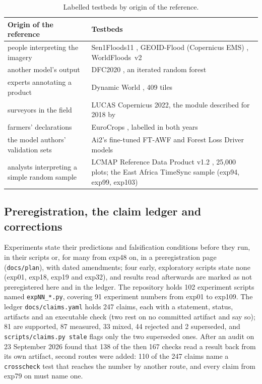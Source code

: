 \documentclass[11pt,a4paper]{article}
\newcommand{\code}[1]{\texttt{#1}}
\begin{document}
\begin{table}[h]
\centering\small
\begin{tabularx}{\linewidth}{lX}
\toprule
Origin of the reference & Testbeds \\
\midrule
people interpreting the imagery & Sen1Floods11 \citep{bonafilia2020}, GEOID-Flood (Copernicus EMS) \citep{chiriaco2026}, WorldFloods~v2 \\
another model's output & DFC2020 \citep{yokoya2020}, an iterated random forest \\
experts annotating a product & Dynamic World \citep{brown2022}, 409 tiles \\
surveyors in the field & LUCAS Copernicus 2022, the module described for 2018 by \citet{dandrimont2021} \\
farmers' declarations & EuroCrops \citep{schneider2023}, labelled in both years \\
the model authors' validation sets & Ai2's fine-tuned FT-AWF and Forest Loss Driver models \\
analysts interpreting a simple random sample & LCMAP Reference Data Product v1.2 \citep{pengra2020}, 25,000 plots; the East Africa TimeSync sample (exp94, exp99, exp103) \\
\bottomrule
\end{tabularx}
\caption{Labelled testbeds by origin of the reference.}
\label{tab:refs}
\end{table}

\subsection{Preregistration, the claim ledger and corrections}
\label{sec:protocol-ledger}

Experiments state their predictions and falsification conditions before they run, in their scripts or, for many from
exp48 on, in a preregistration page (\code{docs/plan}), with dated amendments; four early, exploratory scripts state
none (exp01, exp18, exp19 and exp32), and results read afterwards are marked as not preregistered here and in the
ledger. The repository holds 102 experiment scripts named \code{expNN\_*.py},
covering 91 experiment numbers from exp01 to exp109. The ledger \code{docs/claims.yaml} holds 247 claims, each with a
statement, status, artifacts and an executable check (two rest on no committed artifact and say so); 81 are supported, 87 measured, 33 mixed, 44 rejected and 2
superseded, and \code{scripts/claims.py stale} flags only the two superseded ones. After an audit on 23 September 2026
found that 138 of the then 167 checks read a result back from its own artifact, second routes were added: 110 of the
247 claims name a \code{crosscheck} test that reaches the number by another route, and every claim from exp79 on must
name one.
\end{document}

